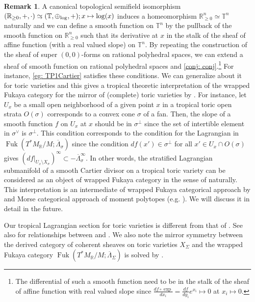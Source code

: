 \documentclass[a4paper,dvipdfmx,reqno,12pt]{amsart}
\theoremstyle{definition}
\newtheorem{Rmk}[Thm]{Remark}
\newcommand{\R}{\mathbb{R}}%
\newcommand{\mb}[1]{\mathbb{#1}}%
\newcommand{\opn}[1]{\operatorname{#1}}
\newcommand{\simto}{ 
\mathrel{\raisebox{0.13em}{${\sim}$}}
\kern -0.75em \mathrel{\raisebox{-0.11em}{${\scriptstyle \to}$}}  
}
\numberwithin{equation}{section}
\begin{document}
\begin{Rmk}
A canonical topological semifield isomorphism 
$(\R_{\geq 0},+,\cdot)\simto 
(\mb{T},\oplus_{\opn{log}},+);x\mapsto \log(x)$
induces a homeomorphism $\R_{\geq 0}^{n}\simeq \mb{T}^{n}$
naturally and we can define a smooth function on 
$\mb{T}^{n}$ by the pullback of the smooth function on 
$\R_{\geq 0}^{n}$ such that its derivative at $x$ in
the stalk of the sheaf of affine function
(with a real valued slope) on $\mb{T}^{n}$.
 By repeating
the construction of the sheaf of super $(0,0)$-forms on 
rational polyhedral spaces, we can extend a sheaf of
smooth function on rational polyhedral spaces and
\cref{conj: conj}.\footnote{
The differential of such a smooth function 
need to be in the stalk of the sheaf of affine function 
with real valued slope since 
$\frac{df\circ \opn{exp}}{dx_i}=
\frac{df}{dy_i}e^{x_i}\mapsto 0$ at 
$x_i\mapsto 0$.}
 For instance, \cref{eg: TP1Cartier} satisfies 
these conditions. We can generalize about it for toric
varieties and this gives a tropical theoretic interpretation 
of the wrapped Fukaya category for the mirror of
(complete) toric varieties by \cite{MR2871160}.
For instance, let $U_{x}$ be a small open neighborhood of 
a given point $x$ in a tropical toric open strata $O(\sigma)$
 corresponds to a convex cone $\sigma$ of a fan.
Then, the slope of a smooth function $f$ on $U_{x}$ at $x$
should be in $\sigma^{\bot}$ since the set of intertible element
in $\sigma^{\vee}$ is $\sigma^{\bot}$.
This condition corresponds to the condition for the Lagrangian
in $\opn{Fuk}(T^{*}M_{\R}/M;\overline{\Lambda}_{\sigma})$ 
\cite[3.1]{MR2871160} since
the condition $df(x')\in\sigma^{\bot}$ for all 
$x'\in U_x\cap O(\sigma)$ gives 
$(df|_{U_{x}\setminus X_{\sigma}})^{\infty}\subset 
-\overline{\Lambda}_{\sigma}^{\infty}$.
In other words, the stratified Lagrangian submanifold 
of a smooth Cartier divisor on a tropical toric variety
can be considered as 
an object of wrapped Fukaya category in the sense of
\cite{MR2871160} naturally. This interpretation is 
an intermediate of wrapped Fukaya categorical approach by
\cite{MR2871160}
and Morse categorical approach of moment polytopes
(e.g. \cite{MR4234675}).
We will discuss it in detail in the future.

Our tropical Lagrangian section for toric varieties is 
different from that of \cite{MR2240909,MR2529936}.
See also \cite[Appendix C.2.]{MR2871160} for relationships
between \cite{MR2871160} and \cite{MR2240909,MR2529936}.
We also note the mirror symmetry between the derived category of
coherent sheaves on toric varieties $X_{\Sigma}$ and
the wrapped Fukaya category 
$\opn{Fuk}(T^{*}M_{\R}/M;\overline{\Lambda}_{\Sigma})$
is solved by \cite{MR4132582}.
\end{Rmk}
\end{document}
